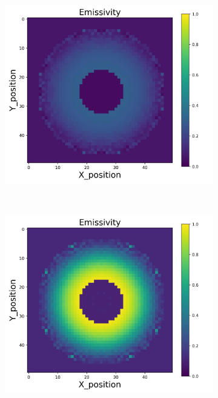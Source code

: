 {\begin{figure}[p]
\begin{minipage}{\textwidth}
\begin{subfigure}{0.325\textwidth}
        \end{subfigure}
        \begin{subfigure}{0.325\textwidth}
            \centering
            \includegraphics[width=\textwidth]{figures/raw_data/21/lin_square/emi_cal.jpg}
        \end{subfigure}
    \end{minipage}\\
    \begin{minipage}{\textwidth}
        \centering
        \begin{subfigure}{0.325\textwidth}
            \centering
            \includegraphics[width=\textwidth]{figures/raw_data/22/lin_square/emi_cal.jpg}

\end{subfigure}
\end{minipage}
\end{figure}}
